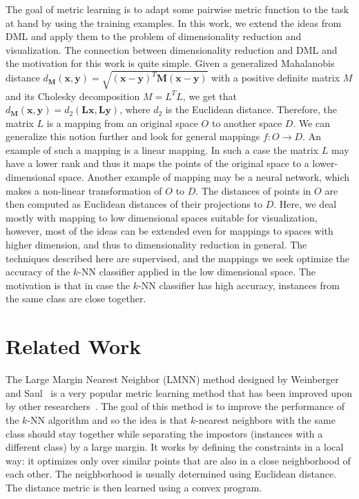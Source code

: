 The goal of metric learning is to adapt some pairwise metric function to the task at hand by using the training examples. In this work, we extend the ideas from DML and apply them to the problem of dimensionality reduction and visualization. The connection between dimensionality reduction and DML and the motivation for this work is quite simple. Given a generalized Mahalanobis distance $d_{\bm{M}}(\textbf{x},\textbf{y}) = \sqrt{(\textbf{x}-\textbf{y})^{T}\bm{M}(\textbf{x}-\textbf{y})}$ with a positive definite matrix $M$ and its Cholesky decomposition $M=L^TL$, we get that $d_{\bm{M}}(\textbf{x},\textbf{y}) = d_{2}(\bm{L}\textbf{x},\bm{L}\textbf{y})$, where $d_2$ is the Euclidean distance. Therefore, the matrix $L$ is a mapping from an original space $O$ to another space $D$. We can generalize this notion further and look for general mappings $f: O \to D$. An example of such a mapping is a linear mapping. In such a case the matrix $L$ may have a lower rank and thus it maps the points of the original space to a lower-dimensional space. Another example of mapping may be a neural network, which makes a non-linear transformation of $O$ to $D$. The distances of points in $O$ are then computed as Euclidean distances of their projections to $D$. Here, we deal mostly with mapping to low dimensional spaces suitable for visualization, however, most of the ideas can be extended even for mappings to spaces with higher dimension, and thus to dimensionality reduction in general. The techniques described here are supervised, and the mappings we seek optimize the accuracy of the $k$-NN classifier applied in the low dimensional space. The motivation is that in case the $k$-NN classifier has high accuracy, instances from the same class are close together.

\section{Related Work}
The Large Margin Nearest Neighbor (LMNN) method designed by Weinberger and Saul~\cite{weinberger2009distance} is a very popular metric learning method that has been improved upon by other researchers~\cite{weinberger2008fast,parameswaran2010large,kedem2012non}. The goal of this method is to improve the performance of the $k$-NN algorithm and so the idea is that $k$-nearest neighbors with the same class should stay together while separating the impostors (instances with a different class) by a large margin. It works by defining the constraints in a local way: it optimizes only over similar points that are also in a close neighborhood of each other. The neighborhood is usually determined using Euclidean distance. The distance metric is then learned using a convex program. 

